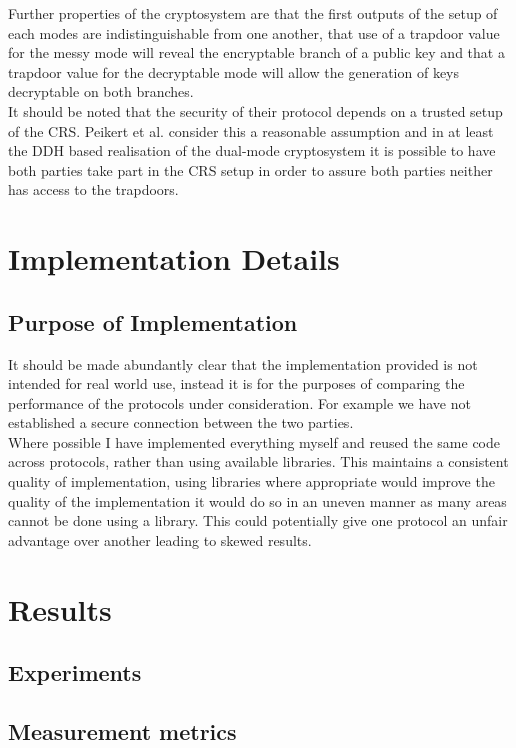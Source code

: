 \documentclass[a4paper,11pt]{article}
\begin{document}
 			Further properties of the cryptosystem are that the first outputs of the setup of each modes are indistinguishable from one another, that use of a trapdoor value for the messy mode will reveal the encryptable branch of a public key and that a trapdoor value for the decryptable mode will allow the generation of keys decryptable on both branches.\\

			It should be noted that the security of their protocol depends on a trusted setup of the CRS. Peikert et al. consider this a reasonable assumption and in at least the DDH based realisation of the dual-mode cryptosystem it is possible to have both parties take part in the CRS setup in order to assure both parties neither has access to the trapdoors.

	\section{Implementation Details} \label{sec:ImplementationDetails}
		\subsection{Purpose of Implementation}
			It should be made abundantly clear that the implementation provided is not intended for real world use, instead it is for the purposes of comparing the performance of the protocols under consideration. For example we have not established a secure connection between the two parties.\\

			Where possible I have implemented everything myself and reused the same code across protocols, rather than using available libraries. This maintains a consistent quality of implementation, using libraries where appropriate would improve the quality of the implementation it would do so in an uneven manner as many areas cannot be done using a library. This could potentially give one protocol an unfair advantage over another leading to skewed results.\\

	\section{Results} \label{sec:Results}
		\subsection{Experiments}
		
		\subsection{Measurement metrics}
		
\end{document}
